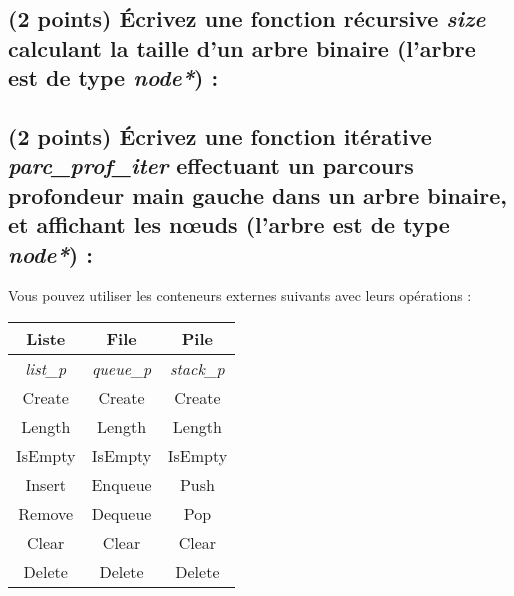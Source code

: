 \documentclass[11pt,a4paper]{article}
\begin{document}
%
%



\subsection{(2 points) \'Ecrivez une fonction récursive \og \textit{size} \fg{} calculant la taille d'un arbre binaire (l'arbre est de type \textit{node*}) : }

\begin{center}
\end{center}


\clearpage


\subsection{(2 points) \'Ecrivez une fonction itérative \og \textit{parc\_prof\_iter} \fg{} effectuant un parcours profondeur main gauche dans un arbre binaire, et affichant les nœuds (l'arbre est de type \textit{node*}) : }

\begin{center}

Vous pouvez utiliser les conteneurs externes suivants avec leurs opérations :

\medskip

\begin{tabular}{ |c|c|c| }
\hline
\textbf{Liste}    & \textbf{File}     & \textbf{Pile} \\ \hline
\textit{list\_p}  & \textit{queue\_p} & \textit{stack\_p} \\ \hline
Create  & Create  & Create  \\ \hline
Length  & Length  & Length  \\ \hline
IsEmpty & IsEmpty & IsEmpty \\ \hline
Insert  & Enqueue & Push    \\ \hline
Remove  & Dequeue & Pop     \\ \hline
Clear   & Clear   & Clear   \\ \hline
Delete  & Delete  & Delete  \\ \hline
\end{tabular}

\medskip

\end{center}
\end{document}
